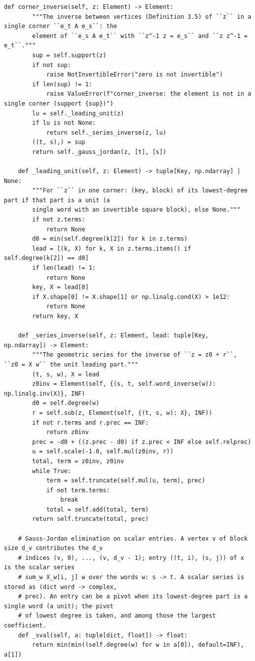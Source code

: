 \documentclass[12pt, a4paper]{report}
\theoremstyle{plain}
\theoremstyle{definition}
\theoremstyle{remark}
\theoremstyle{plain}
\begin{document}
\begin{lstlisting}[style=dsqcode]
    def corner_inverse(self, z: Element) -> Element:
        """The inverse between vertices (Definition 3.5) of ``z`` in a single corner ``e_t A e_s``: the
        element of ``e_s A e_t`` with ``z^-1 z = e_s`` and ``z z^-1 = e_t``."""
        sup = self.support(z)
        if not sup:
            raise NotInvertibleError("zero is not invertible")
        if len(sup) != 1:
            raise ValueError(f"corner_inverse: the element is not in a single corner (support {sup})")
        lu = self._leading_unit(z)
        if lu is not None:
            return self._series_inverse(z, lu)
        ((t, s),) = sup
        return self._gauss_jordan(z, [t], [s])

    def _leading_unit(self, z: Element) -> tuple[Key, np.ndarray] | None:
        """For ``z`` in one corner: (key, block) of its lowest-degree part if that part is a unit (a
        single word with an invertible square block), else None."""
        if not z.terms:
            return None
        d0 = min(self.degree(k[2]) for k in z.terms)
        lead = [(k, X) for k, X in z.terms.items() if self.degree(k[2]) == d0]
        if len(lead) != 1:
            return None
        key, X = lead[0]
        if X.shape[0] != X.shape[1] or np.linalg.cond(X) > 1e12:
            return None
        return key, X

    def _series_inverse(self, z: Element, lead: tuple[Key, np.ndarray]) -> Element:
        """The geometric series for the inverse of ``z = z0 + r``, ``z0 = X w`` the unit leading part."""
        (t, s, w), X = lead
        z0inv = Element(self, {(s, t, self.word_inverse(w)): np.linalg.inv(X)}, INF)
        d0 = self.degree(w)
        r = self.sub(z, Element(self, {(t, s, w): X}, INF))
        if not r.terms and r.prec == INF:
            return z0inv
        prec = -d0 + ((z.prec - d0) if z.prec < INF else self.relprec)
        u = self.scale(-1.0, self.mul(z0inv, r))
        total, term = z0inv, z0inv
        while True:
            term = self.truncate(self.mul(u, term), prec)
            if not term.terms:
                break
            total = self.add(total, term)
        return self.truncate(total, prec)

    # Gauss-Jordan elimination on scalar entries. A vertex v of block size d_v contributes the d_v
    # indices (v, 0), ..., (v, d_v - 1); entry ((t, i), (s, j)) of x is the scalar series
    # sum_w X_w[i, j] w over the words w: s -> t. A scalar series is stored as (dict word -> complex,
    # prec). An entry can be a pivot when its lowest-degree part is a single word (a unit); the pivot
    # of lowest degree is taken, and among those the largest coefficient.
    def _sval(self, a: tuple[dict, float]) -> float:
        return min(min((self.degree(w) for w in a[0]), default=INF), a[1])


\end{lstlisting}
\end{document}
